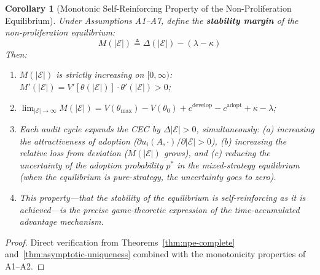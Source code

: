 \documentclass[12pt,a4paper]{article}
\newtheorem{corollary}[theorem]{Corollary}
\theoremstyle{definition}
\theoremstyle{remark}
\begin{document}
\begin{corollary}[Monotonic Self-Reinforcing Property of the Non-Proliferation Equilibrium]
\label{cor:self-reinforcing}
Under Assumptions A1--A7, define the \textbf{stability margin} of the non-proliferation equilibrium:
\begin{equation}
M(|\mathcal{E}|) \triangleq \Delta(|\mathcal{E}|) - (\lambda - \kappa)
\end{equation}
Then:
\begin{enumerate}[label=(\roman*)]
\item $M(|\mathcal{E}|)$ is strictly increasing on $[0, \infty)$: $M'(|\mathcal{E}|) = V'[\theta(|\mathcal{E}|)] \cdot \theta'(|\mathcal{E}|) > 0$;
\item $\lim_{|\mathcal{E}| \to \infty} M(|\mathcal{E}|) = V(\theta_{\max}) - V(\theta_0) + c^{\text{develop}} - c^{\text{adopt}} + \kappa - \lambda$;
\item Each audit cycle expands the CEC by $\Delta |\mathcal{E}| > 0$, simultaneously: (a) increasing the attractiveness of adoption ($\partial u_i(A, \cdot) / \partial |\mathcal{E}| > 0$), (b) increasing the relative loss from deviation ($M(|\mathcal{E}|)$ grows), and (c) reducing the uncertainty of the adoption probability $p^*$ in the mixed-strategy equilibrium (when the equilibrium is pure-strategy, the uncertainty goes to zero).
\item This property—that the stability of the equilibrium is self-reinforcing as it is achieved—is the precise game-theoretic expression of the \textit{time-accumulated advantage} mechanism.
\end{enumerate}
\end{corollary}

\begin{proof}
Direct verification from Theorems~\ref{thm:npe-complete} and~\ref{thm:asymptotic-uniqueness} combined with the monotonicity properties of A1--A2.
\end{proof}
\end{document}
